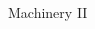 \documentclass[aspectratio=169,10pt]{beamer}
\newcommand{\imwidth}{\linewidth}%
\newcommand{\imheight}{0.618\paperheight}%
\newcommand{\source}[2]{%
	\raisebox{-1.618ex}{%
		\makebox[0pt][r]{%
			\scriptsize\href{http://#1}{#1} #2%
			}%
		}%
	}%
\begin{document}
%
%
\begin{frame}[label=current]{Machinery II}
	\begin{columns}
		\hfill
		\begin{column}{0.4\linewidth}
			
		\end{column}
		\hfill		
		\begin{column}{0.4\linewidth}
			
		\end{column}
		\hfill		
	\end{columns}
\end{frame}
\end{document}

